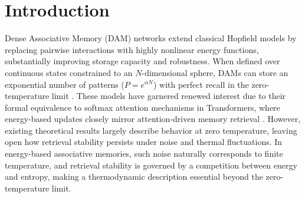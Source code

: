 \documentclass{article}
\theoremstyle{plain}
\theoremstyle{definition}
\theoremstyle{remark}
\begin{document}
\printAffiliationsAndNotice{}  %

\begin{abstract}
\textbf{We study the memory capacity of modern Hopfield networks (Dense Associative Memory models) for structured data, such as binary patterns and low-dimensional manifolds, extending classical analyses of unstructured patterns.}
We derive thermodynamic phase boundaries for Dense Associative Memory networks with exponential capacity $p = e^{\alpha N}$, comparing Gaussian (LSE) and Epanechnikov (LSR) kernels. For continuous neurons on an $N$-sphere, the geometric entropy depends solely on the spherical geometry, not the kernel. Sufficiently sharp kernels achieve maximum theoretical capacity $\alpha = 0.5$ at zero temperature; below this threshold, a critical line separates retrieval from a spin-glass phase. Kernel sharpness introduces a trade-off between energetic stability and entropic cost: while LSR provides deeper energy minima, it exhibits a smaller retrieval region than LSE at finite temperature because enforcing higher alignment incurs a geometric entropy penalty that outweighs the energetic gain. The kernels also differ qualitatively in their thermal limits: LSR possesses a finite maximum retrieval temperature, whereas LSE permits retrieval at arbitrarily high temperatures for sufficiently low loads
\textbf{These results advance the theory of high-capacity associative memory and inform the design of structured memory in modern attention-based architectures.}
\end{abstract}

\section{Introduction}

Dense Associative Memory (DAM) networks extend classical Hopfield models by replacing pairwise interactions with highly nonlinear energy functions, substantially improving storage capacity and robustness. When defined over continuous states constrained to an $N$-dimensional sphere, DAMs can store an exponential number of patterns ($P = e^{\alpha N}$) with perfect recall in the zero-temperature limit \citep{demircigil2017model,ramsauer2021hopfield,lucibello2024exponential}. These models have garnered renewed interest due to their formal equivalence to softmax attention mechanisms in Transformers, where energy-based updates closely mirror attention-driven memory retrieval \citep{ramsauer2021hopfield}. However, existing theoretical results largely describe behavior at zero temperature, leaving open how retrieval stability persists under noise and thermal fluctuations. In energy-based associative memories, such noise naturally corresponds to finite temperature, and retrieval stability is governed by a competition between energy and entropy, making a thermodynamic description essential beyond the zero-temperature limit.
\end{document}
